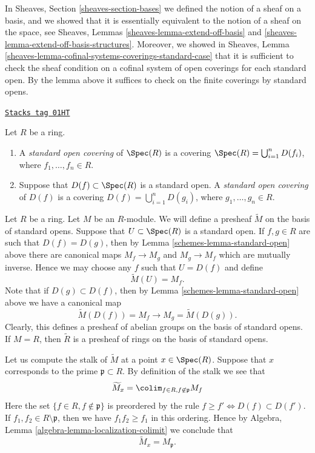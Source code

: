 In Sheaves, Section \ref{sheaves-section-bases} we defined
the notion of a sheaf on a basis, and we showed that it is
essentially equivalent to the notion of a sheaf on the space,
see Sheaves, Lemmas \ref{sheaves-lemma-extend-off-basis} and
\ref{sheaves-lemma-extend-off-basis-structures}. Moreover,
we showed in
Sheaves, Lemma \ref{sheaves-lemma-cofinal-systems-coverings-standard-case}
that it is sufficient to check the sheaf
condition on a cofinal system of open coverings for each
standard open. By the lemma above it suffices to check
on the finite coverings by standard opens.

\begin{definition}
\label{schemes-definition-standard-covering}
\href{https://stacks.math.columbia.edu/tag/01HT}{\texttt{Stacks tag 01HT}}

Let $R$ be a ring.
\begin{enumerate}
\item A {\it standard open covering} of $\Spec(R)$
is a covering $\Spec(R) = \bigcup_{i = 1}^n D(f_i)$,
where $f_1, \ldots, f_n \in R$.
\item Suppose that $D(f) \subset \Spec(R)$ is a standard
open. A {\it standard open covering} of $D(f)$
is a covering $D(f) = \bigcup_{i = 1}^n D(g_i)$,
where $g_1, \ldots, g_n \in R$.
\end{enumerate}
\end{definition}

Let $R$ be a ring. Let $M$ be an $R$-module. We will define
a presheaf $\widetilde M$ on the basis of standard opens.
Suppose that $U \subset \Spec(R)$ is a standard open.
If $f, g \in R$ are such that $D(f) = D(g)$, then
by Lemma \ref{schemes-lemma-standard-open} above there are canonical
maps $M_f \to M_g$ and $M_g \to M_f$ which are mutually inverse.
Hence we may choose any $f$ such that $U = D(f)$
and define
$$
\widetilde M(U) = M_f.
$$
Note that if $D(g) \subset D(f)$, then by
Lemma \ref{schemes-lemma-standard-open} above we have
a canonical map
$$
\widetilde M(D(f)) = M_f \longrightarrow M_g = \widetilde M(D(g)).
$$
Clearly, this defines a presheaf of abelian groups on the basis
of standard opens. If $M = R$, then $\widetilde R$ is a presheaf
of rings on the basis of standard opens.

\medskip\noindent
Let us compute the stalk of $\widetilde M$ at a point $x \in \Spec(R)$.
Suppose that $x$ corresponds to the prime $\mathfrak p \subset R$.
By definition of the stalk we see that
$$
\widetilde M_x = \colim_{f\in R, f\not\in \mathfrak p} M_f
$$
Here the set $\{f \in R, f \not \in \mathfrak p\}$ is preordered by
the rule $f \geq f' \Leftrightarrow D(f) \subset D(f')$.
If $f_1, f_2 \in R \setminus \mathfrak p$, then we have
$f_1f_2 \geq f_1$ in this ordering. Hence by
Algebra, Lemma \ref{algebra-lemma-localization-colimit}
we conclude that
$$
\widetilde M_x = M_{\mathfrak p}.
$$

